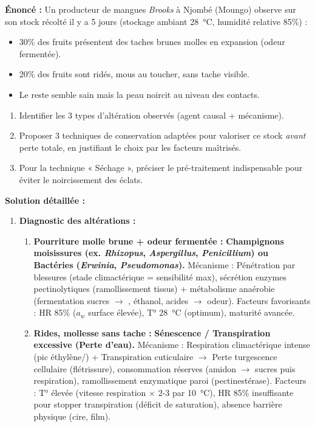 \documentclass[11pt]{article}
\begin{document}
\begin{exoresolu}
    \textbf{Énoncé :} Un producteur de mangues \emph{Brooks} à Njombé (Moungo) observe sur son stock récolté il y a 5 jours (stockage ambiant \SI{28}{\celsius}, humidité relative 85\%) :
    \begin{itemize}
        \item 30\% des fruits présentent des taches brunes molles en expansion (odeur fermentée).
        \item 20\% des fruits sont ridés, mous au toucher, sans tache visible.
        \item Le reste semble sain mais la peau noircit au niveau des contacts.
    \end{itemize}
    \begin{enumerate}
        \item Identifier les 3 types d'altération observés (agent causal + mécanisme).
        \item Proposer 3 techniques de conservation adaptées pour valoriser ce stock \emph{avant} perte totale, en justifiant le choix par les facteurs maîtrisés.
        \item Pour la technique « Séchage », préciser le pré-traitement indispensable pour éviter le noircissement des éclats.
    \end{enumerate}
    \tcblower
    \textbf{Solution détaillée :}
    \begin{enumerate}
        \item \textbf{Diagnostic des altérations :}
            \begin{enumerate}
                \item \textbf{Pourriture molle brune + odeur fermentée :} \textbf{Champignons moisissures (ex. \textit{Rhizopus}, \textit{Aspergillus}, \textit{Penicillium}) ou Bactéries (\textit{Erwinia}, \textit{Pseudomonas}).} Mécanisme : Pénétration par blessures (stade climactérique = sensibilité max), sécrétion enzymes pectinolytiques (ramollissement tissus) + métabolisme anaérobie (fermentation sucres $\rightarrow$ , éthanol, acides $\rightarrow$ odeur). Facteurs favorisants : HR 85\% ($a_w$ surface élevée), T° \SI{28}{\celsius} (optimum), maturité avancée.
                \item \textbf{Rides, mollesse sans tache :} \textbf{Sénescence / Transpiration excessive (Perte d'eau).} Mécanisme : Respiration climactérique intense (pic éthylène/) + Transpiration cuticulaire $\rightarrow$ Perte turgescence cellulaire (flétrissure), consommation réserves (amidon $\rightarrow$ sucres puis respiration), ramollissement enzymatique paroi (pectinestérase). Facteurs : T° élevée (vitesse respiration $\times$ 2-3 par \SI{10}{\celsius}), HR 85\% insuffisante pour stopper transpiration (déficit de saturation), absence barrière physique (cire, film).

\end{enumerate}
\end{enumerate}
\end{exoresolu}
\end{document}
